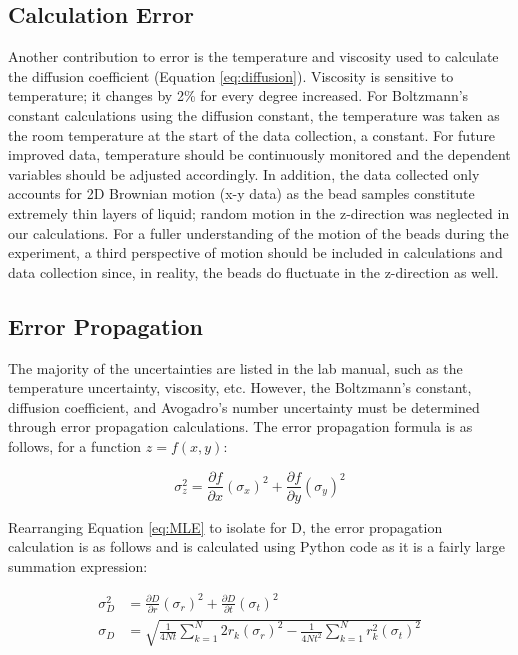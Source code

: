 \documentclass[12pt, letterpaper, twoside]{article}
\begin{document}
\subsection{Calculation Error}

Another contribution to error is the temperature and viscosity used to calculate the diffusion coefficient (Equation \ref{eq:diffusion}). Viscosity is sensitive to temperature; it changes by 2\% for every degree increased. For Boltzmann’s constant calculations using the diffusion constant, the temperature was taken as the room temperature at the start of the data collection, a constant. For future improved data, temperature should be continuously monitored and the dependent variables should be adjusted accordingly. In addition, the data collected only accounts for 2D Brownian motion (x-y data) as the bead samples constitute extremely thin layers of liquid; random motion in the z-direction was neglected in our calculations. For a fuller understanding of the motion of the beads during the experiment, a third perspective of motion should be included in calculations and data collection since, in reality, the beads do fluctuate in the z-direction as well.

\subsection{Error Propagation}

The majority of the uncertainties are listed in the lab manual, such as the temperature uncertainty, viscosity, etc. However, the Boltzmann's constant, diffusion coefficient, and Avogadro's number uncertainty must be determined through error propagation calculations. The error propagation formula is as follows, for a function $z = f(x,y)$:

\begin{equation*}
    \sigma_z^2 = \frac{\partial f}{\partial x}(\sigma_x)^2 + \frac{\partial f}{\partial y}(\sigma_y)^2
\end{equation*}

Rearranging Equation \ref{eq:MLE} to isolate for D, the error propagation calculation is as follows and is calculated using Python code as it is a fairly large summation expression:

\begin{align*}
    \sigma_D^2 &= \frac{\partial D}{\partial r}(\sigma_r)^2 + \frac{\partial D}{\partial t}(\sigma_t)^2 \\
    \sigma_D &= \sqrt{\frac{1}{4Nt}\sum_{k=1}^N2r_k(\sigma_r)^2 -\frac{1}{4Nt^2}\sum_{k=1}^Nr_k^2(\sigma_t)^2}    
\end{align*}
\end{document}
